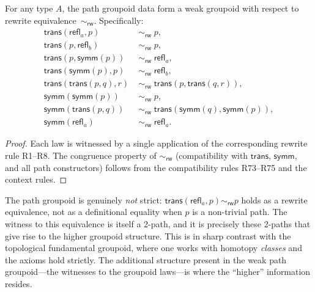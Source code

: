 \documentclass[manuscript]{BSLstyle}
\newcommand{\refl}{\mathsf{refl}}
\newcommand{\symm}{\mathsf{symm}}
\newcommand{\trans}{\mathsf{trans}}
\newcommand{\rweq}{\sim_{\mathsf{rw}}}
\begin{document}
\begin{theorem}\label{thm:weak-path-groupoid}
For any type $A$, the path groupoid data form a weak groupoid with
respect to rewrite equivalence~$\rweq$.  Specifically:
\begin{align}
\trans(\refl_a, p) &\;\rweq\; p, \tag{G1: left identity} \\
\trans(p, \refl_b) &\;\rweq\; p, \tag{G2: right identity} \\
\trans(p, \symm(p)) &\;\rweq\; \refl_a, \tag{G3: right inverse} \\
\trans(\symm(p), p) &\;\rweq\; \refl_b, \tag{G4: left inverse} \\
\trans(\trans(p, q), r) &\;\rweq\; \trans(p, \trans(q, r)), \tag{G5: associativity} \\
\symm(\symm(p)) &\;\rweq\; p, \tag{G6: involution} \\
\symm(\trans(p, q)) &\;\rweq\; \trans(\symm(q), \symm(p)), \tag{G7: contravariance} \\
\symm(\refl_a) &\;\rweq\; \refl_a. \tag{G8: identity inverse}
\end{align}
\end{theorem}

\begin{proof}
Each law is witnessed by a single application of the corresponding
rewrite rule R1--R8.  The congruence property of $\rweq$
(compatibility with $\trans$, $\symm$, and all path constructors)
follows from the compatibility rules R73--R75 and the context rules.
\end{proof}

\begin{remark}
The path groupoid is genuinely \emph{not} strict:
$\trans(\refl_a, p) \rweq p$ holds as a rewrite equivalence, not as a
definitional equality when $p$ is a non-trivial path.  The witness to
this equivalence is itself a 2-path, and it is precisely these 2-paths
that give rise to the higher groupoid structure.
This is in sharp contrast with the topological fundamental groupoid,
where one works with homotopy \emph{classes} and the axioms hold
strictly.  The additional structure present in the weak path groupoid---the
witnesses to the groupoid laws---is where the ``higher'' information
resides.
\end{remark}
\end{document}
